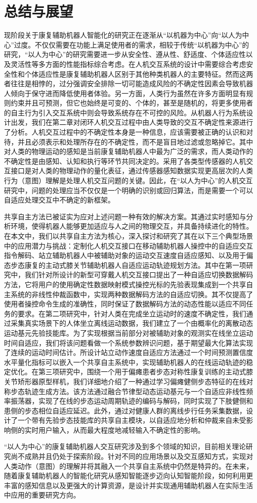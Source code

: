 \chapter{总结与展望}
现阶段关于康复辅助机器人智能化的研究正在逐渐从``以机器为中心''向``以人为中心''过度。不仅仅需要在功能上满足使用者的需求，相较于传统``以机器为中心''的研究，``以人为中心''的研究需要进一步从安全性、遵从性、舒适度、个体适应性以及灵活性等多方面的性能指标综合考虑。在人机交互系统的设计中需要综合考虑安全性和个体适应性是康复辅助机器人区别于其他种类机器人的主要特征。然而这两者往往是相悖的，过分强调安全排除一切可能造成风险的不确定性因素会导致机器人倾向于保守进而降低使用者体验。另一方面，人类行为虽然在许多方面明显有规则约束并且可预测，但它也始终是可变的、个体的，甚至是随机的，将更多使用者的自主行为引入交互系统中则会导致系统存在不可控的风险。从机器人行为系统设计出发，我们在第二章对闭环人机交互过程中由人类导致的交互不确定性来源进行了分析。人机交互过程中的不确定性本身是一种信息，应该需要被正确的认识和对待，并且必须表示和处理所存在的不确定性，而不是盲目地过滤或忽略掉它。其中对人类的物理运动的感知是当前康复辅助机器人中最为广泛的需求，而人类动作的不确定性是由感知、认知和执行等环节共同决定的。采用了各类型传感器的人机交互接口是对人类的物理动作的量化表征，通过传感器感知数据实现更高层次的人类行为（意图）理解是处理人机交互问题的关键。因此，在``以人为中心''的人机交互研究中，问题的处理应当不仅仅是一个明确的识别或回归算法，而是需要一个可以自适应处理交互中不确定的新框架。

共享自主方法已被证实为应对上述问题一种有效的解决方案。其通过实时感知与分析环境，使得机器人能够更加适应与人之间的物理交互，并具备持续进化的特性。在本文中，我们以共享自主方法为核心，深入探讨和研究了其在以下三个典型场景中的应用潜力与挑战：定制化人机交互接口在移动辅助机器人操控中的自适应交互指令解码、站立辅助机器人中被辅助对象的运动交互速度自适应感知、以及用于偏态步态康复的主动式膝关节辅助机器人自适应运动轨迹规划方法。其中在第一项研究中，我们针对所设计的新型可穿戴人机交互接口提出了一种自适应切换数据解码方法，它将用户的使用确定性数据映射模式操控光标的先验表现集成到一个共享自主系统的非线性仲裁函数中，实现两种数据解码方法的自适应切换。其不仅提高了使用者操控命令生成的准确性，同时保证了数据解码方法的动态性能以适应不同任务的要求。在第二项研究中，针对人类在完成坐立运动时的速度不确定性，我们通过采集真实场景下的人体坐立离线运动数据，我们建立了一个由概率化的离散动态运动基元先验技能库。为了实现根据当前部分对被辅助对象的观测实在线坐立运动时间自适应，我们将该问题看做一个系统参数辨识问题，基于期望最大化算法实现了连续的运动时间估计。所设计站立动作速度自适应方法通过一个时间预测置信度水平量化指标可以嵌入一个共享自主系统中，实现辅助机器人的在线运动轨迹的稳定优化。在第三项研究中，围绕一个用于偏瘫患者步态对称性康复训练的主动式膝关节矫形器原型样机，我们详细地介绍了一种通过学习偏瘫健侧步态特征的在线对称步态轨迹生成方法。该方法通过融合节律型动态运动基元与一个自适应非线性频率振荡器，实现了在线的步态运动周期轨迹的编码与解码，同时实现了下肢健侧和患侧的步态相位自适应延迟。此外，通过对健康人群的离线步行任务采集数据，设计了一个带有先验步态技能库的共享自主模块，以自适应地分析和仲裁来自未受影响侧的实时用户输入，从而最大程度地减轻输入不确定性的影响。

``以人为中心''的康复辅助机器人交互研究涉及到多个领域的知识，目前相关理论研究尚不成熟并且仍处于探索阶段。针对不同的应用场景以及交互感知方式，实现对人类动作（意图）的理解并将其融入一个共享自主系统中仍然是特异的。在未来，随着康复辅助机器人的智能化研究从感知智能逐步迈向认知智能阶段，如何利用更丰富的感知信息以及更强大的计算资源，是设计并实现通用辅助机器人在实际生活中应用的重要研究方向。